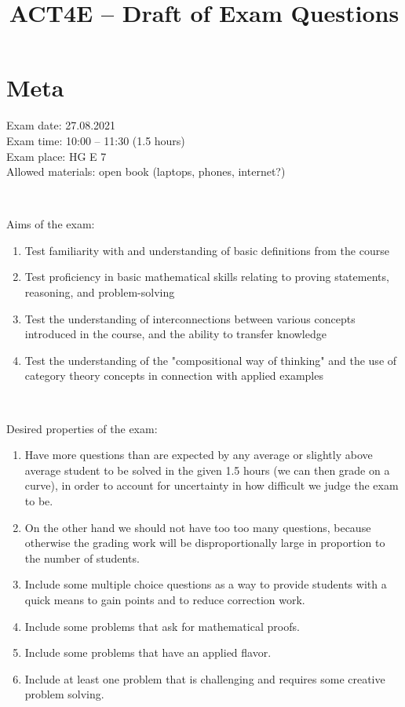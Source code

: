 \documentclass[paper=8.125in:10.250in,pagesize=pdftex,
    headinclude=false,footinclude=false,oneside,egregdoesnotlikesansseriftitles]{kaobook}
\title{ACT4E -- Draft of Exam Questions}
\begin{document}

\maketitle

\section*{Meta}

\noindent
Exam date: 27.08.2021 \\
Exam time: 10:00 -- 11:30  (1.5 hours) \\ 
Exam place: HG E 7 \\
Allowed materials: open book (laptops, phones, internet?)

\

\noindent
Aims of the exam: 
\begin{enumerate}
\item Test familiarity with and understanding of basic definitions from the course
\item Test proficiency in basic mathematical skills relating to proving statements, reasoning, and problem-solving
\item Test the understanding of interconnections between various concepts introduced in the course, and the ability to transfer knowledge
\item Test the understanding of the "compositional way of thinking" and the use of category theory concepts in connection with applied examples
\end{enumerate}

\

\noindent
Desired properties of the exam: 
\begin{enumerate}
\item Have more questions than are expected by any average or slightly above average student to be solved in the given 1.5 hours (we can then grade on a curve), in order to account for uncertainty in how difficult we judge the exam to be. 
\item On the other hand we should not have too too many questions, because otherwise the grading work will be disproportionally large in proportion to the number of students. 
\item Include some multiple choice questions as a way to provide students with a quick means to gain points and to reduce correction work. 
\item Include some problems that ask for mathematical proofs. 
\item Include some problems that have an applied flavor. 
\item Include at least one problem that is challenging and requires some creative problem solving. 
\end{enumerate}
\end{document}
